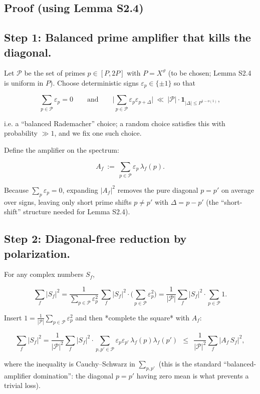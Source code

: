 \documentclass[11pt]{article}
\theoremstyle{definition}
\theoremstyle{remark}
\begin{document}
\subsection*{Proof (using Lemma S2.4)}

\subsection*{Step 1: Balanced prime amplifier that kills the diagonal.}
Let $\mathcal P$ be the set of primes $p\in[P,2P]$ with $P=X^\vartheta$ (to be chosen; Lemma S2.4 is uniform in $P$).
Choose deterministic signs $\varepsilon_p\in\{\pm 1\}$ so that

$$
\sum_{p\in\mathcal P}\varepsilon_p=0
\qquad\text{and}\qquad
\Big|\sum_{p\in\mathcal P}\varepsilon_p\varepsilon_{p+\Delta}\Big|\ \ll\ |\mathcal P|\cdot \mathbf{1}_{|\Delta|\le P^{1-o(1)}},
$$

i.e. a “balanced Rademacher” choice; a random choice satisfies this with probability $\gg 1$, and we fix one such choice.

Define the amplifier on the spectrum:

$$
A_f \ :=\ \sum_{p\in\mathcal P}\varepsilon_p\,\lambda_f(p).
$$

Because $\sum_p\varepsilon_p=0$, expanding $|A_f|^2$ removes the pure diagonal $p=p'$ on average over signs, leaving only short prime shifts $p\neq p'$ with $\Delta = p-p'$ (the “short-shift” structure needed for Lemma S2.4).

\subsection*{Step 2: Diagonal-free reduction by polarization.}
For any complex numbers $S_f$,

$$
\sum_f |S_f|^2
=\frac{1}{\sum_{p\in\mathcal P}\varepsilon_p^2}\,
\sum_f |S_f|^2\cdot \Big(\sum_{p\in\mathcal P}\varepsilon_p^2\Big)
=\frac{1}{|\mathcal P|}\sum_f |S_f|^2\cdot \sum_{p\in\mathcal P}1.
$$

Insert $1=\frac{1}{|\mathcal P|}\sum_{p\in\mathcal P}\varepsilon_p^2$ and then *complete the square* with $A_f$:

$$
\sum_f |S_f|^2
=\frac{1}{|\mathcal P|^2}\sum_f |S_f|^2\cdot \sum_{p,p'\in\mathcal P}\varepsilon_p\varepsilon_{p'}\,\lambda_f(p)\lambda_f(p')
\ \ \le\ \ \frac{1}{|\mathcal P|^2}\sum_f |A_f\,S_f|^2,
$$

where the inequality is Cauchy–Schwarz in $\sum_{p,p'}$ (this is the standard “balanced-amplifier domination”: the diagonal $p=p'$ having zero mean is what prevents a trivial loss).
\end{document}
